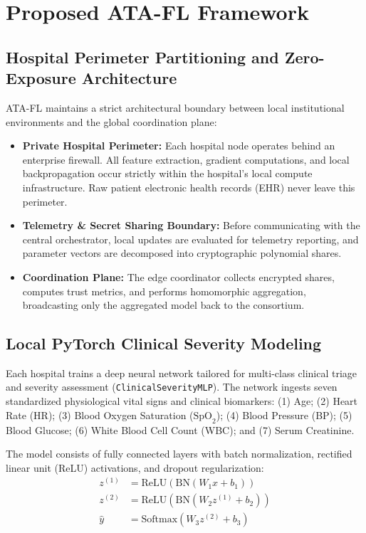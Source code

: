 \documentclass[conference]{IEEEtran}
\begin{document}
\section{Proposed ATA-FL Framework}

\subsection{Hospital Perimeter Partitioning and Zero-Exposure Architecture}
ATA-FL maintains a strict architectural boundary between local institutional environments and the global coordination plane:
\begin{itemize}
    \item \textbf{Private Hospital Perimeter:} Each hospital node operates behind an enterprise firewall. All feature extraction, gradient computations, and local backpropagation occur strictly within the hospital's local compute infrastructure. Raw patient electronic health records (EHR) never leave this perimeter.
    \item \textbf{Telemetry \& Secret Sharing Boundary:} Before communicating with the central orchestrator, local updates are evaluated for telemetry reporting, and parameter vectors are decomposed into cryptographic polynomial shares.
    \item \textbf{Coordination Plane:} The edge coordinator collects encrypted shares, computes trust metrics, and performs homomorphic aggregation, broadcasting only the aggregated model back to the consortium.
\end{itemize}

\subsection{Local PyTorch Clinical Severity Modeling}
Each hospital trains a deep neural network tailored for multi-class clinical triage and severity assessment (\texttt{ClinicalSeverityMLP}). The network ingests seven standardized physiological vital signs and clinical biomarkers: (1) Age; (2) Heart Rate (HR); (3) Blood Oxygen Saturation ($\text{SpO}_2$); (4) Blood Pressure (BP); (5) Blood Glucose; (6) White Blood Cell Count (WBC); and (7) Serum Creatinine.

The model consists of fully connected layers with batch normalization, rectified linear unit (ReLU) activations, and dropout regularization:
\begin{align}
z^{(1)} &= \text{ReLU}(\text{BN}(W_1 x + b_1)) \\
z^{(2)} &= \text{ReLU}(\text{BN}(W_2 z^{(1)} + b_2)) \\
\hat{y} &= \text{Softmax}(W_3 z^{(2)} + b_3)
\end{align}
\end{document}

